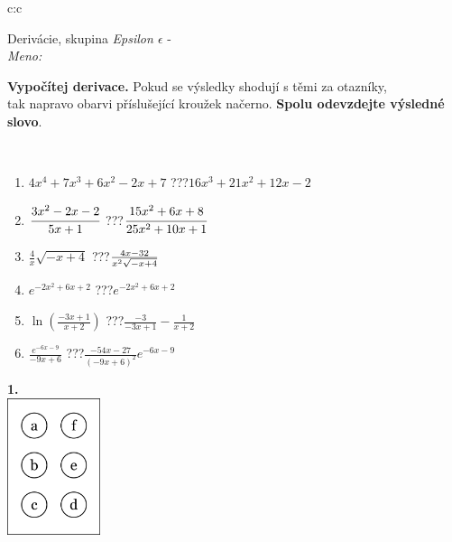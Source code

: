 \documentclass[10pt]{report}
\begin{document}
\begin{tabular}{c:c}
\begin{minipage}[c][104.5mm][t]{0.5\linewidth}
\begin{center}
\vspace{7mm}
{\huge Derivácie, skupina \textit{Epsilon $\epsilon$} -}\\[5mm]
\textit{Meno:}\phantom{xxxxxxxxxxxxxxxxxxxxxxxxxxxxxxxxxxxxxxxxxxxxxxxxxxxxxxxxxxxxxxxxx}\\[5mm]
\begin{minipage}{0.95\linewidth}
\begin{center}
\textbf{Vypočítej derivace.} Pokud se výsledky shodují s těmi za otazníky,\\tak napravo obarvi příslušející kroužek načerno. \textbf{Spolu odevzdejte výsledné slovo}.
\end{center}
\end{minipage}
\\[1mm]
\begin{minipage}{0.79\linewidth}
\begin{center}
\begin{varwidth}{\linewidth}
\begin{enumerate}
\normalsize
\item $4x^4+7x^3+6x^2-2x+7$\quad \dotfill\; ???\;\dotfill \quad $16x^3+21x^2+12x-2$
\item $\cfrac{3x^2-2x-2}{5x+1}$\quad \dotfill\; ???\;\dotfill \quad $\cfrac{15x^2+6x+8}{25x^2+10x+1}$
\item $\frac{4}{x}\sqrt{-x+4}$\quad \dotfill\; ???\;\dotfill \quad $\frac{4x-32}{x^2 \sqrt{\smash[b]{-x+4}}}$
\item $e^{-2x^2+6x+2}$\quad \dotfill\; ???\;\dotfill \quad $e^{-2x^2+6x+2}$
\item $\ln{\left(\frac{-3x+1}{x+2}\right)}$\quad \dotfill\; ???\;\dotfill \quad $\frac{-3}{-3x+1}-\frac{1}{x+2}$
\item $\frac{e^{-6x-9}}{-9x+6}$\quad \dotfill\; ???\;\dotfill \quad $\frac{-54x-27}{(-9x+6)^2}e^{-6x-9}$
\end{enumerate}
\end{varwidth}
\end{center}
\end{minipage}
\begin{minipage}{0.20\linewidth}
\begin{center}
{\Huge\bfseries 1.} \\[2mm]
\includegraphics[height=40mm]{../images/braille.png}

\end{center}
\end{minipage}
\end{center}
\end{minipage}
\end{tabular}
\end{document}
